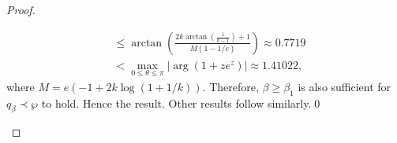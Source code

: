 \documentclass[12pt, reqno]{amsart}
\numberwithin{equation}{section}
\theoremstyle{plain}
\theoremstyle{definition}
\theoremstyle{remark}
\begin{document}
\begin{proof}
\begin{itemize}
\begin{align*}
		&\leq \arctan\left(\frac{2k\arctan(\frac{1}{k-1})+1}{M(1-1/e)}\right) \approx 0.7719\\
		&<\max_{0\leq\theta\leq\pi}|\arg(1+ze^z)| \approx 1.41022,
		\end{align*}
		where $M=e(-1+2k\log(1+1/k))$.
		Therefore, $\beta\geq\beta_{1}$ is also sufficient for $q_{\beta}\prec\wp$ to hold. Hence the result. Other results follow similarly.\qed

\end{itemize}
\end{proof}
\end{document}
